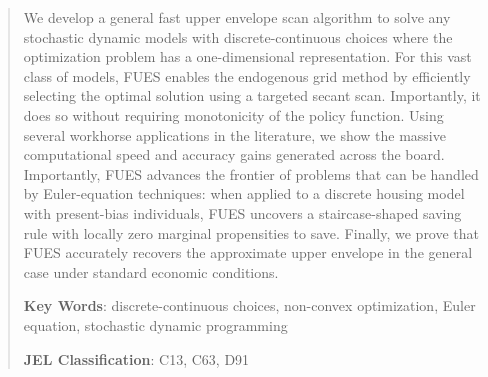 \documentclass[12pt]{article}
\begin{document}
\begin{abstract}
We develop a general fast upper envelope scan algorithm to solve any stochastic dynamic models with discrete-continuous choices where the optimization problem has a one-dimensional representation. For this vast class of models, FUES enables the endogenous grid method by efficiently selecting the optimal solution using a targeted secant scan. Importantly, it does so without requiring monotonicity of the policy function. Using several workhorse applications in the literature, we show the massive computational speed and accuracy gains generated across the board. Importantly, FUES advances the frontier of problems that can be handled by Euler-equation techniques: when applied to a discrete housing model with present-bias individuals, FUES uncovers a staircase-shaped saving rule with locally zero marginal propensities to save. Finally, we prove that FUES accurately recovers the approximate upper envelope in the general case under standard economic conditions. 


\vspace{1em}
\textbf{Key Words}: discrete-continuous choices, non-convex optimization, Euler equation, stochastic dynamic programming

\textbf{JEL Classification}: C13, C63, D91
\end{abstract}

\newpage

\onehalfspacing

\end{document}
